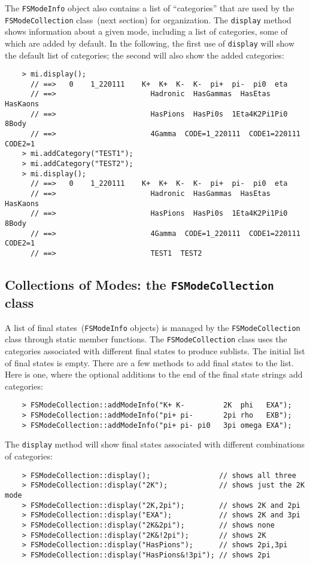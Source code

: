 \documentclass[11pt]{article}
\begin{document}
The {\tt FSModeInfo} object also contains a list of ``categories'' that are used by the {\tt FSModeCollection} class~(next section) for organization.  The {\tt display} method shows information about a given mode, including a list of categories, some of which are added by default.  In the following, the first use of {\tt display} will show the default list of categories; the second will also show the added categories:
\begin{verbatim}
    > mi.display();
      // ==>   0    1_220111    K+  K+  K-  K-  pi+  pi-  pi0  eta 
      // ==>                      Hadronic  HasGammas  HasEtas  HasKaons  
      // ==>                      HasPions  HasPi0s  1Eta4K2Pi1Pi0  8Body  
      // ==>                      4Gamma  CODE=1_220111  CODE1=220111  CODE2=1
    > mi.addCategory("TEST1");
    > mi.addCategory("TEST2");
    > mi.display();
      // ==>   0    1_220111    K+  K+  K-  K-  pi+  pi-  pi0  eta 
      // ==>                      Hadronic  HasGammas  HasEtas  HasKaons  
      // ==>                      HasPions  HasPi0s  1Eta4K2Pi1Pi0  8Body  
      // ==>                      4Gamma  CODE=1_220111  CODE1=220111  CODE2=1
      // ==>                      TEST1  TEST2
\end{verbatim}

\subsection{Collections of Modes: the {\tt FSModeCollection} class}
\label{sec:modecollection}

A list of final states~({\tt FSModeInfo} objects) is managed by the {\tt FSModeCollection} class through static member functions.  The {\tt FSModeCollection} class uses the categories associated with different final states to produce sublists.  The initial list of final states is empty.  There are a few methods to add final states to the list.  Here is one, where the optional additions to the end of the final state strings add categories:
\begin{verbatim}
    > FSModeCollection::addModeInfo("K+ K-         2K  phi   EXA");
    > FSModeCollection::addModeInfo("pi+ pi-       2pi rho   EXB");
    > FSModeCollection::addModeInfo("pi+ pi- pi0   3pi omega EXA");
\end{verbatim}

The {\tt display} method will show final states associated with different combinations of categories:
\begin{verbatim}
    > FSModeCollection::display();                // shows all three
    > FSModeCollection::display("2K");            // shows just the 2K mode
    > FSModeCollection::display("2K,2pi");        // shows 2K and 2pi
    > FSModeCollection::display("EXA");           // shows 2K and 3pi
    > FSModeCollection::display("2K&2pi");        // shows none
    > FSModeCollection::display("2K&!2pi");       // shows 2K
    > FSModeCollection::display("HasPions");      // shows 2pi,3pi
    > FSModeCollection::display("HasPions&!3pi"); // shows 2pi
\end{verbatim}
\end{document}
